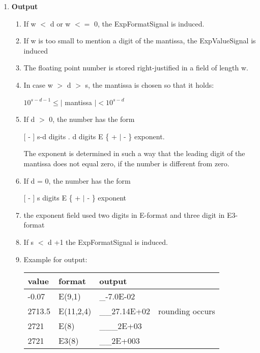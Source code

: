 \begin{enumerate}
\item {\bf Output}\\
\begin{enumerate}
\item If w $<$ d or w $<=$ 0, the ExpFormatSignal is induced. 

\item If w is too small to mention a digit of the mantissa,
    the ExpValueSignal is induced

\item The floating point number is stored right-justified in a
 field of length w.

\item In case w $>$ d $>$ s, the mantissa is chosen so that it holds:

\hspace*{1cm}$10^{s-d-1} \leq \mid$ mantissa $\mid < 10^{s-d}$

\item If d $>$ 0, the number has the form

\hspace*{1cm}[ - ] s-d digits . d digits E \{ + $\mid$ - \} exponent.

The exponent is determined in such a way that the leading digit of the
mantissa does not equal zero, if the number is different from zero.

\item If d = 0, the number has the form

\hspace*{1cm}[ - ] s digits E \{ + $\mid$ - \} exponent

\item the exponent field used two digits in E-format and 
      three digit in E3-format

\item If s $<$ d +1 the ExpFormatSignal is induced.
\item Example for output:

\begin{tabular}{llll}
value  & format    & output \\ \hline
-0.07  & E(9,1)    & \_-7.0E-02 \\
2713.5 & E(11,2,4) & \_\_27.14E+02 & rounding occurs\\
2721   & E(8)      & \_\_\_2E+03 \\
2721   & E3(8)      & \_\_2E+003
\end{tabular}


\end{enumerate}
\end{enumerate}
